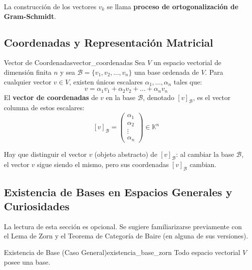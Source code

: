 \documentclass[11pt, a4paper]{article}
\begin{document}
\obs La construcción de los vectores $v_k$ se llama \textbf{proceso de ortogonalización de Gram-Schmidt}.

\subsection{Coordenadas y Representación Matricial}

\begin{definicion}{Vector de Coordenadas}{vector_coordenadas}
Sea $V$ un espacio vectorial de dimensión finita $n$ y sea $\mathcal{B} = \{v_1, v_2, \dots, v_n\}$ una base ordenada de $V$.
Para cualquier vector $v \in V$, existen únicos escalares $\alpha_1, \dots, \alpha_n$ tales que:
\[ v = \alpha_1 v_1 + \alpha_2 v_2 + \dots + \alpha_n v_n \]
El \textbf{vector de coordenadas} de $v$ en la base $\mathcal{B}$, denotado $[v]_\mathcal{B}$, es el vector columna de estos escalares:
\[ [v]_\mathcal{B} = \begin{pmatrix} \alpha_1 \\ \alpha_2 \\ \vdots \\ \alpha_n \end{pmatrix} \in \mathbb{K}^n \]
\end{definicion}

\obs Hay que distinguir el vector $v$ (objeto abstracto) de $[v]_\mathcal{B}$: al cambiar la base $\mathcal{B}$, el vector $v$ sigue siendo el mismo, pero sus coordenadas $[v]_\mathcal{B}$ cambian.

\subsection{Existencia de Bases en Espacios Generales y Curiosidades}

La lectura de esta sección es opcional. Se sugiere familiarizarse previamente con el Lema de Zorn y el Teorema de Categoría de Baire (en alguna de sus versiones).

\begin{teorema}{Existencia de Base (Caso General)}{existencia_base_zorn}
Todo espacio vectorial $V$ posee una base.
\end{teorema}
\end{document}
